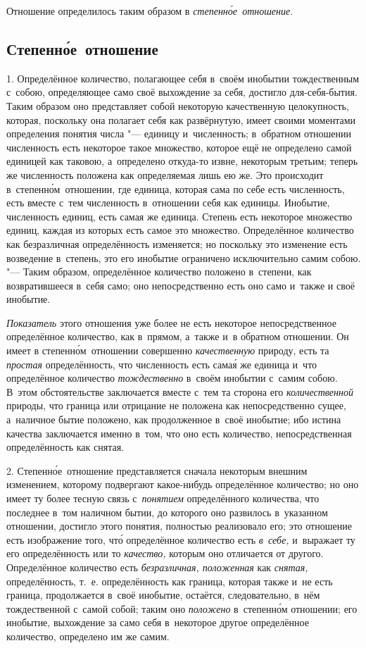 Отношение определилось таким образом в {\em степенн\'{о}е~отношение}.

\subsection{Степенн\'{о}е~отношение}

1. Определённое количество, полагающее себя в~своём инобытии тождественным
с~собою, определяющее само своё выхождение за себя, достигло для-себя-бытия.
Таким образом оно представляет собой некоторую качественную целокупность,
которая, поскольку она полагает себя как развёрнутую, имеет своими моментами
определения понятия числа "--- единицу и~численность; в~обратном отношении
численность есть некоторое такое множество, которое ещё не определено самой
единицей как таковою, а~определено откуда-то извне, некоторым третьим; теперь
же численность положена как определяемая лишь ею же. Это происходит
в~степенн\'{о}м~отношении, где единица, которая сама по себе есть численность,
есть вместе с~тем численность в~отношении себя как единицы. Инобытие,
численность единиц, есть самая же единица. Степень есть некоторое множество
единиц, каждая из которых есть самое это множество. Определённое количество как
безразличная определённость изменяется; но поскольку это изменение есть
возведение в~степень, это его инобытие ограничено исключительно самим собою.
"--- Таким образом, определённое количество положено в~степени, как
возвратившееся в~себя само; оно непосредственно есть оно само и~также
и своё инобытие.

{\em Показатель} этого отношения уже более не есть некоторое непосредственное
определённое количество, как в~прямом, а~также и~в обратном отношении. Он имеет
в степенн\'{о}м~отношении совершенно {\em качественную} природу, есть та
{\em простая} определённость, что численность есть сама\'{я} же единица и~что
определённое количество {\em тождественно} в~своём инобытии с~самим собою.
В~этом обстоятельстве заключается вместе с~тем та сторона его
{\em количественной} природы, что граница или отрицание не положена как
непосредственно сущее, а~наличное бытие положено, как продолженное в~своё
инобытие; ибо истина качества заключается именно в~том, что оно есть
количество, непосредственная определённость как снятая.

2. Степенн\'{о}е~отношение представляется сначала некоторым внешним изменением,
которому подвергают какое-нибудь определённое количество; но оно имеет ту более
тесную связь с~{\em понятием} определённого количества, что последнее в~том
наличном бытии, до которого оно развилось в~указанном отношении, достигло этого
понятия, полностью реализовало его; это отношение есть изображение того,
чт\'{о} определённое количество есть {\em в~себе,} и~выражает ту его
определённость или то {\em качество,} которым оно отличается от другого.
Определённое количество есть {\em безразличная, положенная} как {\em снятая,}
определённость, т.~е. определённость как граница, которая также и~не есть
граница, продолжается в~своё инобытие, остаётся, следовательно, в~нём
тождественной с~самой собой; таким оно {\em положено} в~степенн\'{о}м
отношении; его инобытие, выхождение за само себя в~некоторое другое
определённое количество, определено им же самим.

